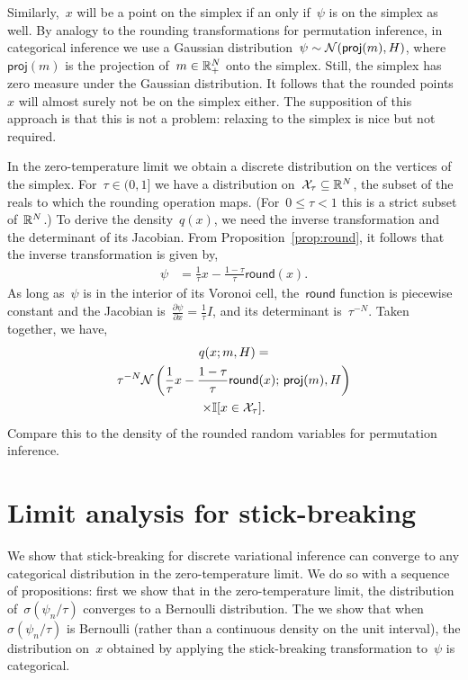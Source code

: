 \documentclass[twoside]{article}
\begin{document}
Similarly,~$x$ will be a point on the simplex if an only if~$\psi$ is
on the simplex as well.  By analogy to the rounding transformations
for permutation inference, in categorical inference we use a Gaussian
distribution~${\psi \sim \mathcal{N}(\mathsf{proj}(m), H)}$,
where~$\mathsf{proj}(m)$ is the projection of~$m \in \mathbb{R}_+^N$ onto
the simplex.  Still, the simplex has zero measure under the Gaussian
distribution.  It follows that the rounded points~$x$ will almost
surely not be on the simplex either.  The supposition of this approach
is that this is not a problem: relaxing to the simplex is nice but not
required.

In the zero-temperature limit we obtain a discrete distribution on the
vertices of the simplex.  For~${\tau \in (0,1]}$ we have a
distribution on~${\mathcal{X}_\tau \subseteq \mathbb{R}^N}$, the subset of the
reals to which the rounding operation maps. (For~${0 \leq \tau < 1}$
this is a strict subset of~$\mathbb{R}^N$.) To derive the
density~$q(x)$, we need the inverse transformation and the
determinant of its Jacobian.  From Proposition~\ref{prop:round}, it
follows that the inverse transformation is given by,
\begin{align*}
  \psi &= \frac{1}{\tau} x - \frac{1 - \tau}{\tau} \mathsf{round}(x).
\end{align*}
As long as~$\psi$ is in the interior of its Voronoi cell,
the~$\mathsf{round}$ function is piecewise constant and the
Jacobian is~${\tfrac{\partial\psi}{\partial x} = \tfrac{1}{\tau} I}$,
and its determinant is~$\tau^{-N}$. Taken together, we have,
\begin{multline*}
  q(x; m, H) =  \\
  \tau^{-N} \mathcal{N} \left(\frac{1}{\tau}x - \frac{1-\tau}{\tau} \mathsf{round}(x); \, \mathsf{proj}(m), H \right) \\
  \times \mathbb{I}[x \in \mathcal{X}_\tau].
\end{multline*}
Compare this to the density of the rounded random variables for
permutation inference. 

\section{Limit analysis for stick-breaking}

We show that stick-breaking for discrete variational inference can
converge to any categorical distribution in the zero-temperature
limit.  We do so with a sequence of propositions: first we show that
in the zero-temperature limit, the distribution
of~${\sigma(\psi_n / \tau)}$ converges to a Bernoulli distribution.
The we show that when~$\sigma(\psi_n / \tau)$ is Bernoulli (rather
than a continuous density on the unit interval), the distribution
on~$x$ obtained by applying the stick-breaking transformation
to~$\psi$ is categorical.
\end{document}
